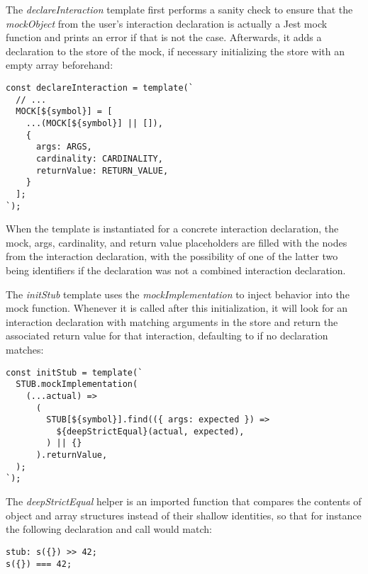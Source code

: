 The \textit{declareInteraction} template first
performs a sanity check to ensure that
the \textit{mockObject} from the user's interaction declaration
is actually a Jest mock function and
prints an error if that is not the case.
Afterwards, it adds a declaration to the store of the mock,
if necessary initializing the store with an empty array beforehand:
\begin{verbatim}
const declareInteraction = template(`
  // ...
  MOCK[${symbol}] = [
    ...(MOCK[${symbol}] || []),
    {
      args: ARGS,
      cardinality: CARDINALITY,
      returnValue: RETURN_VALUE,
    }
  ];
`);
\end{verbatim}
When the template is instantiated for a concrete interaction declaration,
the mock, args, cardinality, and return value placeholders
are filled with the nodes from the interaction declaration,
with the possibility of one of the latter two being  identifiers
if the declaration was not a combined interaction declaration.

The \textit{initStub} template uses the \textit{mockImplementation}
to inject behavior into the mock function.
Whenever it is called after this initialization,
it will look for an interaction declaration
with matching arguments in the store
and return the associated return value for that interaction,
defaulting to  if no declaration matches:
\begin{verbatim}
const initStub = template(`
  STUB.mockImplementation(
    (...actual) =>
      (
        STUB[${symbol}].find(({ args: expected }) =>
          ${deepStrictEqual}(actual, expected),
        ) || {}
      ).returnValue,
  );
`);
\end{verbatim}
The \textit{deepStrictEqual} helper is an imported function
that compares the contents of object and array structures
instead of their shallow identities,
so that for instance the following declaration and call would match:
\begin{verbatim}
stub: s({}) >> 42;
s({}) === 42;
\end{verbatim}
